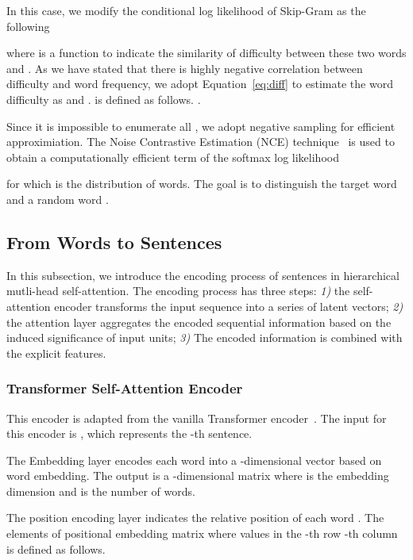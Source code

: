 \documentclass[runningheads]{llncs}
\begin{document}
 In this case, we modify the conditional log likelihood of Skip-Gram as the following

  

\noindent
 where  is a function to indicate the similarity of difficulty between these two words  and . As we have stated that there is {highly negative correlation between difficulty and word frequency}, we adopt Equation~\ref{eq:diff} to estimate the word difficulty as  and .  is defined as follows.
.

 Since it is impossible to enumerate all , we adopt negative sampling for efficient approximiation. The Noise Contrastive Estimation (NCE) technique~\cite{NCE} is used to obtain a computationally efficient term of the softmax log likelihood
   
 for which  is the distribution of words. The goal is to distinguish the target word  and a random word .

\fi
\vspace{-0.5cm}
\subsection{From Words to Sentences}

In this subsection, we introduce the encoding process of sentences in hierarchical mutli-head self-attention. The encoding process has three steps: \textit{1)} the self-attention encoder transforms the input sequence into a series of latent vectors; \textit{2)} the attention layer aggregates the encoded sequential information based on the induced significance of input units; \textit{3)} The encoded information is combined with the explicit features.
\vspace{-0.6cm}
\subsubsection{Transformer Self-Attention Encoder}\label{subsec:transformer}
This encoder is adapted from the vanilla Transformer encoder~\cite{vaswani2017attention}. The input for this encoder is , which represents the -th sentence. 

The Embedding layer encodes each word  into a -dimensional vector based on word embedding. The output is a -dimensional matrix  where  is the embedding dimension and  is the number of words.

The position encoding layer indicates the relative position of each word . The elements of positional embedding matrix  where values in the -th row -th column is defined as follows.	
\end{document}
